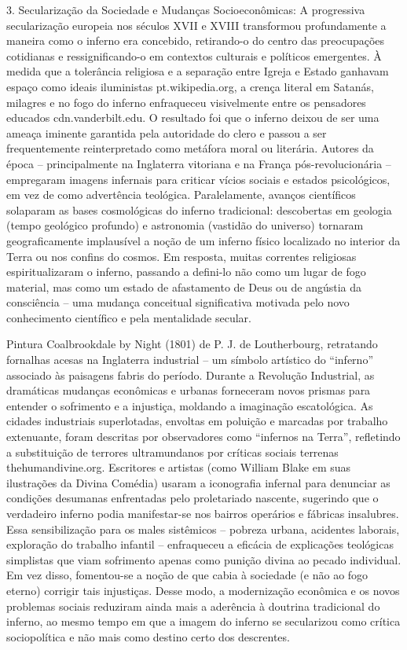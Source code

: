 3. Secularização da Sociedade e Mudanças Socioeconômicas: A progressiva secularização europeia nos séculos XVII e XVIII transformou profundamente a maneira como o inferno era concebido, retirando-o do centro das preocupações cotidianas e ressignificando-o em contextos culturais e políticos emergentes. À medida que a tolerância religiosa e a separação entre Igreja e Estado ganhavam espaço como ideais iluministas pt.wikipedia.org, a crença literal em Satanás, milagres e no fogo do inferno enfraqueceu visivelmente entre os pensadores educados cdn.vanderbilt.edu. O resultado foi que o inferno deixou de ser uma ameaça iminente garantida pela autoridade do clero e passou a ser frequentemente reinterpretado como metáfora moral ou literária. Autores da época -- principalmente na Inglaterra vitoriana e na França pós-revolucionária -- empregaram imagens infernais para criticar vícios sociais e estados psicológicos, em vez de como advertência teológica. Paralelamente, avanços científicos solaparam as bases cosmológicas do inferno tradicional: descobertas em geologia (tempo geológico profundo) e astronomia (vastidão do universo) tornaram geograficamente implausível a noção de um inferno físico localizado no interior da Terra ou nos confins do cosmos. Em resposta, muitas correntes religiosas espiritualizaram o inferno, passando a defini-lo não como um lugar de fogo material, mas como um estado de afastamento de Deus ou de angústia da consciência -- uma mudança conceitual significativa motivada pelo novo conhecimento científico e pela mentalidade secular.

Pintura Coalbrookdale by Night (1801) de P. J. de Loutherbourg, retratando fornalhas acesas na Inglaterra industrial -- um símbolo artístico do “inferno” associado às paisagens fabris do período. Durante a Revolução Industrial, as dramáticas mudanças econômicas e urbanas forneceram novos prismas para entender o sofrimento e a injustiça, moldando a imaginação escatológica. As cidades industriais superlotadas, envoltas em poluição e marcadas por trabalho extenuante, foram descritas por observadores como “infernos na Terra”, refletindo a substituição de terrores ultramundanos por críticas sociais terrenas thehumandivine.org. Escritores e artistas (como William Blake em suas ilustrações da Divina Comédia) usaram a iconografia infernal para denunciar as condições desumanas enfrentadas pelo proletariado nascente, sugerindo que o verdadeiro inferno podia manifestar-se nos bairros operários e fábricas insalubres. Essa sensibilização para os males sistêmicos -- pobreza urbana, acidentes laborais, exploração do trabalho infantil -- enfraqueceu a eficácia de explicações teológicas simplistas que viam sofrimento apenas como punição divina ao pecado individual. Em vez disso, fomentou-se a noção de que cabia à sociedade (e não ao fogo eterno) corrigir tais injustiças. Desse modo, a modernização econômica e os novos problemas sociais reduziram ainda mais a aderência à doutrina tradicional do inferno, ao mesmo tempo em que a imagem do inferno se secularizou como crítica sociopolítica e não mais como destino certo dos descrentes.

